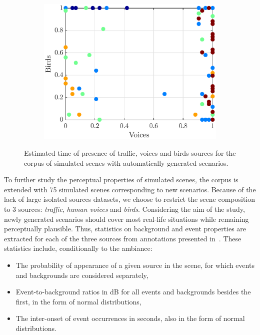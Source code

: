 \documentclass[11pt,a4paper]{article}
\begin{document}
\begin{figure}[h]
\begin{subfigure}[t]{0.33\textwidth}
        \includegraphics[width=\textwidth]{figures/vb_pres.eps}
    \end{subfigure}
    \caption{Estimated time of presence of traffic, voices and birds sources for the corpus of simulated scenes with automatically generated scenarios.}\label{fig:tvb_pres}
\end{figure}

To further study the perceptual properties of simulated scenes, the corpus is extended with 75 simulated scenes corresponding to new scenarios. Because of the lack of large isolated sources datasets, we choose to restrict the scene composition to 3 sources: \textit{traffic}, \textit{human voices} and \textit{birds}. Considering the aim of the study, newly generated scenarios should cover most real-life situations while remaining perceptually plausible. Thus, statistics on background and event properties are extracted for each of the three sources from annotations presented in~\cite{gloaguen2017}. These statistics include, conditionally to the ambiance:

\begin{itemize}
\item The probability of appearance of a given source in the scene, for which events and backgrounds are considered separately,
\item Event-to-background ratios in dB for all events and backgrounds besides the first, in the form of normal distributions,
\item The inter-onset of event occurrences in seconds, also in the form of normal distributions.
\end{itemize}
\end{document}
